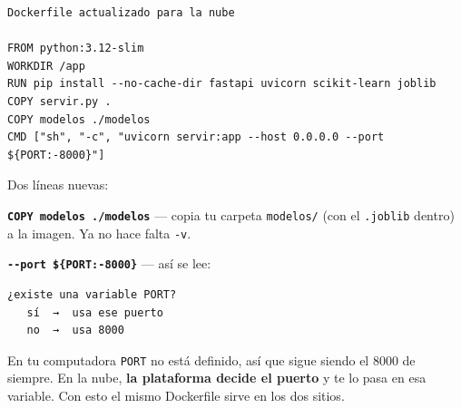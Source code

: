 \documentclass[
]{article}
\newenvironment{Shaded}{}{}
\newcommand{\BuiltInTok}[1]{\textcolor[rgb]{0.00,0.50,0.00}{#1}}
\newcommand{\CharTok}[1]{\textcolor[rgb]{0.25,0.44,0.63}{#1}}
\newcommand{\CommentTok}[1]{\textcolor[rgb]{0.38,0.63,0.69}{\textit{#1}}}
\newcommand{\NormalTok}[1]{#1}
\newcommand{\OperatorTok}[1]{\textcolor[rgb]{0.40,0.40,0.40}{#1}}
\newcommand{\SpecialCharTok}[1]{\textcolor[rgb]{0.25,0.44,0.63}{#1}}
\newcommand{\StringTok}[1]{\textcolor[rgb]{0.25,0.44,0.63}{#1}}
\begin{document}
\protect{}\label{hlBHzqACnYyd}
\begin{Shaded}
\end{Shaded}

\begin{verbatim}
Dockerfile actualizado para la nube

FROM python:3.12-slim
WORKDIR /app
RUN pip install --no-cache-dir fastapi uvicorn scikit-learn joblib
COPY servir.py .
COPY modelos ./modelos
CMD ["sh", "-c", "uvicorn servir:app --host 0.0.0.0 --port ${PORT:-8000}"]
\end{verbatim}

\protect{}\label{txM86Nk6nYye}
Dos líneas nuevas:

\textbf{\texttt{COPY\ modelos\ ./modelos}} --- copia tu carpeta
\texttt{modelos/} (con el \texttt{.joblib} dentro) a la imagen. Ya no
hace falta \texttt{-v}.

\textbf{\texttt{-\/-port\ \$\{PORT:-8000\}}} --- así se lee:

\begin{verbatim}
¿existe una variable PORT?
   sí  →  usa ese puerto
   no  →  usa 8000
\end{verbatim}

En tu computadora \texttt{PORT} no está definido, así que sigue siendo
el 8000 de siempre. En la nube, \textbf{la plataforma decide el puerto}
y te lo pasa en esa variable. Con esto el mismo Dockerfile sirve en los
dos sitios.
\end{document}
